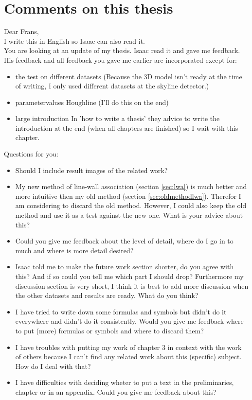 \section{Comments on this thesis}
Dear Frans,\\

I write this in English so Isaac can also read it.\\
You are looking at an update of my thesis. Isaac read it and gave me feedback. His feedback and all feedback you gave me earlier are incorporated except for:\\
\begin{itemize}
\item the test on different datasets
(Because the 3D model isn't ready at the time of writing, 
I only used different datasets at the skyline detector.)
\item parametervalues Houghline
(I'll do this on the end)
\item large introduction
In 'how to write a thesis' they advice to write the introduction at the end
(when all chapters are finished) so I wait with this chapter.
\end{itemize}

Questions for you:\\
\begin{itemize}
\item Should I include result images of the related work?
\item My new method of line-wall association (section \ref{sec:lwa}) is much better and
more intuitive then my old method (section \ref{sec:oldmethodlwa}). Therefor I am considering to discard the old method. However, I could also keep the old method and use it as
a test against the new one. What is your advice about this?\\
\item Could you give me feedback about the level of detail, where do I go in to much and where is more detail desired?\\
\item Isaac told me to make the future work section shorter, do you agree
with this? And if so could you tell me which part I should drop?
Furthermore my discussion section is very short, I think it is best to add more discussion when the other datasets and results are ready. What do you think?\\
\item I have tried to write down some formulas and symbols but didn't do it everywhere and didn't do it consistently. Would you give me feedback where to put (more) formulas or symbols and where to discard them?\\
\item I have troubles with putting my work of chapter 3 in context with the work of others because I can't find any related work about this (specific) subject.  How do I deal with that?\\
\item I have difficulties with deciding wheter to put a text in the preliminaries, chapter or in an appendix. Could you give me feedback about this?
\end{itemize}

